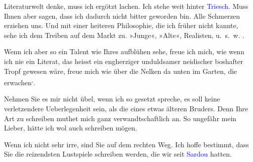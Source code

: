                Literaturwelt denke, muss ich ergötzt lachen. Ich stehe weit {\pb}hinter \textcolor{blue}{Triesch}\ledrightnote{\textcolor{blue}{Friedrich Gustav Triesch}}. Muss Ihnen aber sagen, dass ich dadurch nicht bitter geworden bin.
               Alle Schmerzen erziehen uns. Und mit einer heiteren Philosophie, die ich früher nicht
               kannte, sehe ich dem Treiben auf dem Markt zu. »Junge«, »Alte«, Realisten, u. s. w.
                  \label{K_L03823-5v}\label{K_L03823-5}.\pend
           
\pstart
           Wenn ich aber so ein Talent wie Ihres aufblühen sehe, freue ich
               mich, wie wenn ich nie ein Literat, das heisst ein engherziger unduldsamer neidischer
               boshafter Tropf gewesen wäre, freue mich wie über die Nelken da unten im Garten, die
               erwachen\substVorne{}\textsuperscript{,}\substDazwischen{}.\substHinten{}{ }\strikeout{\textcolor{gray}{×}\-\textcolor{gray}{×}\-\textcolor{gray}{×}\-\textcolor{gray}{×}{ }\textcolor{gray}{×}\-\textcolor{gray}{×}\-\textcolor{gray}{×}{ }\textcolor{gray}{×}\-\textcolor{gray}{×}\-\textcolor{gray}{×}\-\textcolor{gray}{×}\-\textcolor{gray}{×}{ }\textcolor{gray}{×}\-\textcolor{gray}{×}\-\textcolor{gray}{×}}\pend
           
\pstart
           Nehmen Sie es mir nicht übel, wenn ich so gesetzt spreche, es soll keine
               verletzendere Ueberlegenheit sein, als die eines etwas älteren Bruders. Denn Ihre Art
               zu schreiben muthet mich ganz verwandtschaftlich an. So ungefähr mein Lieber, hätte
               ich wol auch {\pb}schreiben mögen.\pend
           
\pstart
           Wenn ich nicht sehr irre, sind Sie auf dem rechten Weg. Ich hoffe bestimmt, dass Sie
               die reizendsten Lustspiele schreiben werden, die wir seit \textcolor{blue}{Sardou}\ledrightnote{\textcolor{blue}{Victorien Sardou}} hatten.\pend
           
